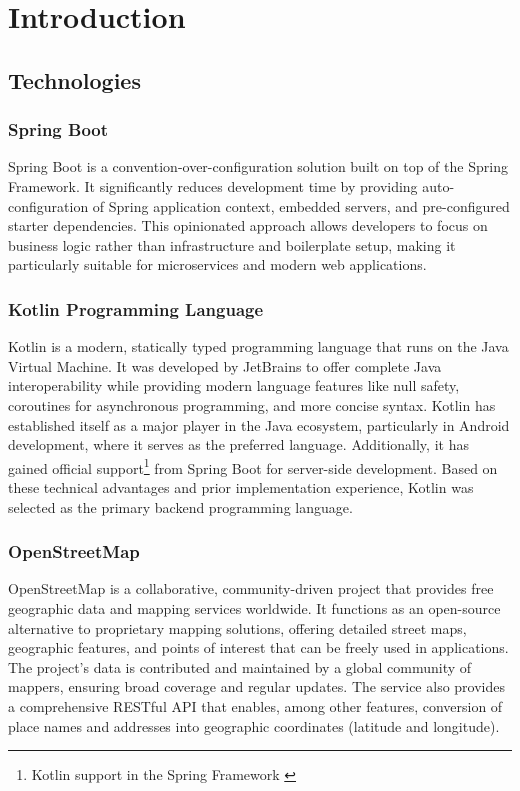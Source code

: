 \renewcommand*\chapterpagestyle{scrheadings}
\chapter{Introduction}

\section{Technologies}

\subsection{Spring Boot}
Spring Boot is a convention-over-configuration solution built on top of the Spring Framework. It significantly reduces development time by providing auto-configuration of Spring application context, embedded servers, and pre-configured starter dependencies. This opinionated approach allows developers to focus on business logic rather than infrastructure and boilerplate setup, making it particularly suitable for microservices and modern web applications.

\subsection{Kotlin Programming Language}
Kotlin is a modern, statically typed programming language that runs on the Java Virtual Machine. It was developed by JetBrains to offer complete Java interoperability while providing modern language features like null safety, coroutines for asynchronous programming, and more concise syntax. Kotlin has established itself as a major player in the Java ecosystem, particularly in Android development, where it serves as the preferred language. Additionally, it has gained official support\footnote{Kotlin support in the Spring Framework \cite{spring-kotlin}} from Spring Boot for server-side development. Based on these technical advantages and prior implementation experience, Kotlin was selected as the primary backend programming language.

\subsection{OpenStreetMap}
OpenStreetMap is a collaborative, community-driven project that provides free geographic data and mapping services worldwide. It functions as an open-source alternative to proprietary mapping solutions, offering detailed street maps, geographic features, and points of interest that can be freely used in applications. The project's data is contributed and maintained by a global community of mappers, ensuring broad coverage and regular updates. The service also provides a comprehensive RESTful API that enables, among other features, conversion of place names and addresses into geographic coordinates (latitude and longitude).

